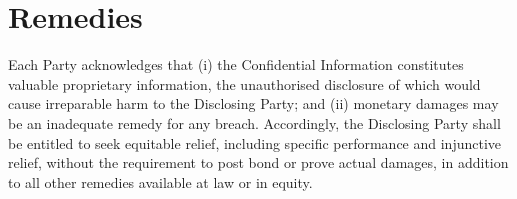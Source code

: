 \section{Remedies}

\noindent
Each Party acknowledges that (i) the Confidential Information constitutes
valuable proprietary information, the unauthorised disclosure of which would
cause irreparable harm to the Disclosing Party; and (ii) monetary damages may
be an inadequate remedy for any breach. Accordingly, the Disclosing Party shall
be entitled to seek equitable relief, including specific performance and
injunctive relief, without the requirement to post bond or prove actual damages,
in addition to all other remedies available at law or in equity.

